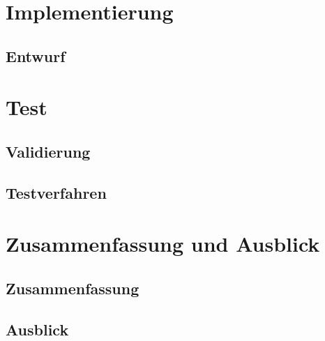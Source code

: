 \documentclass[10pt, a4paper]{scrreprt}
\begin{document}
\chapter{Implementierung}
\section{Entwurf}

\chapter{Test}
\section{Validierung}
\section{Testverfahren}

\chapter{Zusammenfassung und Ausblick}
\section{Zusammenfassung}
\section{Ausblick}







\printindex


\end{document}
